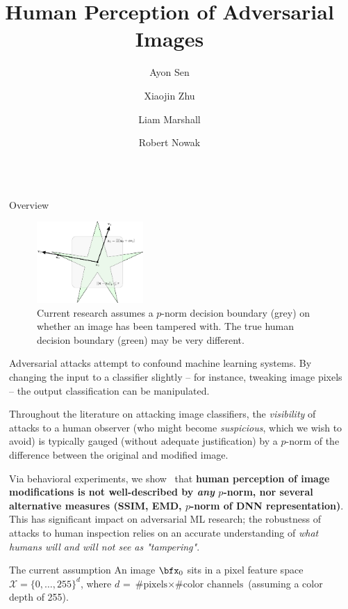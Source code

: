 \documentclass[final,notheorems]{beamer}
\title{Human Perception of Adversarial Images}
\author{Ayon Sen \and Xiaojin Zhu \and Liam Marshall \and Robert Nowak}
\institute[shortinst]{University of Wisconsin-Madison}
\newlength{\sepwidth}
\newlength{\colwidth}
\newcommand{\separatorcolumn}{\begin{column}{\sepwidth}\end{column}}
\def\X{\mathcal X}
\begin{document}
\begin{frame}[t]
\begin{columns}[t]
\separatorcolumn

\begin{column}{\colwidth}
  \begin{block}{Overview}
    \begin{figure}
      \centering
      \includegraphics[width=0.38\textwidth]{fig/intro_image-figure0.eps}
      \caption{Current research assumes a $p$-norm decision boundary (grey) on whether an image has been tampered with. The true human decision boundary (green) may be very different.}
      \label{fig:decision_boundary}
    \end{figure}
    Adversarial attacks attempt to confound machine learning systems. By changing the input to a classifier slightly -- for instance, tweaking image pixels -- the output classification can be manipulated.

    Throughout the literature on attacking image classifiers, the \emph{visibility} of attacks to a human observer (who might become \emph{suspicious}, which we wish to avoid) is typically gauged (without adequate justification) by a $p$-norm of the difference between the original and modified image.

    Via behavioral experiments, we show~\cite{sen2019perception} that \textbf{human perception of image modifications is not well-described by \emph{any} $p$-norm,
    nor several alternative measures (SSIM, EMD, $p$-norm of DNN representation)}.
    This has significant impact on adversarial ML research; the robustness of attacks to human inspection relies on an accurate understanding of \emph{what humans will and will not see as "tampering"}.

  \end{block}

  \begin{alertblock}{The current assumption}
    An image $\bfx_0$ sits in a pixel feature space $\X = \{0,\ldots,255\}^d$, where $d$ = $\text{\# pixels} \times \text{\# color channels}$ (assuming a color depth of 255).


\end{alertblock}
\end{column}
\end{columns}
\end{frame}
\end{document}
